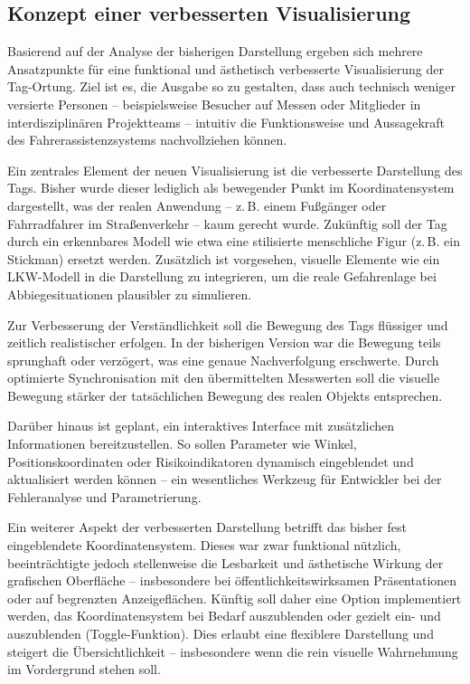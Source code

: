 \documentclass[a4paper, 12pt]{article} %
\begin{document}
\subsection{Konzept einer verbesserten Visualisierung}

Basierend auf der Analyse der bisherigen Darstellung ergeben sich mehrere Ansatzpunkte für eine funktional und ästhetisch verbesserte Visualisierung
der Tag-Ortung. Ziel ist es, die Ausgabe so zu gestalten, dass auch technisch weniger versierte Personen – beispielsweise Besucher auf Messen oder 
Mitglieder in interdisziplinären Projektteams – intuitiv die Funktionsweise und Aussagekraft des Fahrerassistenzsystems nachvollziehen können.

Ein zentrales Element der neuen Visualisierung ist die verbesserte Darstellung des Tags. Bisher wurde dieser lediglich als bewegender Punkt im 
Koordinatensystem dargestellt, was der realen Anwendung – z.\,B. einem Fußgänger oder Fahrradfahrer im Straßenverkehr – kaum gerecht wurde. Zukünftig 
soll der Tag durch ein erkennbares Modell wie etwa eine stilisierte menschliche Figur (z.\,B. ein Stickman) ersetzt werden. Zusätzlich ist vorgesehen,
visuelle Elemente wie ein \ac{LKW}-Modell in die Darstellung zu integrieren, um die reale Gefahrenlage bei Abbiegesituationen plausibler zu simulieren.

Zur Verbesserung der Verständlichkeit soll die Bewegung des Tags flüssiger und zeitlich realistischer erfolgen. In der bisherigen Version war die 
Bewegung teils sprunghaft oder verzögert, was eine genaue Nachverfolgung erschwerte. Durch optimierte Synchronisation mit 
den übermittelten Messwerten soll die visuelle Bewegung stärker der tatsächlichen Bewegung des realen Objekts entsprechen.

Darüber hinaus ist geplant, ein interaktives Interface mit zusätzlichen Informationen bereitzustellen. So sollen Parameter wie Winkel, 
Positionskoordinaten oder Risikoindikatoren dynamisch eingeblendet und aktualisiert werden können – ein wesentliches Werkzeug für Entwickler bei der Fehleranalyse und Parametrierung.

Ein weiterer Aspekt der verbesserten Darstellung betrifft das bisher fest eingeblendete Koordinatensystem. Dieses war zwar funktional nützlich,
beeinträchtigte jedoch stellenweise die Lesbarkeit und ästhetische Wirkung der grafischen Oberfläche – insbesondere bei öffentlichkeitswirksamen 
Präsentationen oder auf begrenzten Anzeigeflächen. Künftig soll daher eine Option implementiert werden, das Koordinatensystem bei Bedarf auszublenden 
oder gezielt ein- und auszublenden (Toggle-Funktion). Dies erlaubt eine flexiblere Darstellung und steigert die Übersichtlichkeit – insbesondere wenn 
die rein visuelle Wahrnehmung im Vordergrund stehen soll.
\end{document}
